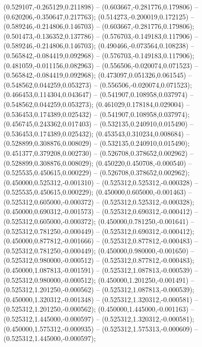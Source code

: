  (0.529107,-0.265129,0.211898) -- (0.603667,-0.281776,0.179806) -- (0.620206,-0.350647,0.217763);
 (0.514273,-0.200019,0.172125) -- (0.589246,-0.214806,0.146703) -- (0.603667,-0.281776,0.179806);
 (0.501473,-0.136352,0.137786) -- (0.576703,-0.149183,0.117906) -- (0.589246,-0.214806,0.146703);
 (0.490466,-0.073564,0.108238) -- (0.565842,-0.084419,0.092968) -- (0.576703,-0.149183,0.117906);
 (0.481059,-0.011156,0.082963) -- (0.556506,-0.020074,0.071523) -- (0.565842,-0.084419,0.092968);
 (0.473097,0.051326,0.061545) -- (0.548562,0.044259,0.053273) -- (0.556506,-0.020074,0.071523);
 (0.466453,0.114304,0.043647) -- (0.541907,0.108958,0.037974) -- (0.548562,0.044259,0.053273);
 (0.461029,0.178184,0.029004) -- (0.536453,0.174389,0.025432) -- (0.541907,0.108958,0.037974);
 (0.456745,0.243362,0.017403) -- (0.532135,0.240910,0.015490) -- (0.536453,0.174389,0.025432);
 (0.453543,0.310234,0.008684) -- (0.528899,0.308876,0.008029) -- (0.532135,0.240910,0.015490);
 (0.451377,0.379208,0.002730) -- (0.526708,0.378652,0.002962) -- (0.528899,0.308876,0.008029);
 (0.450220,0.450708,-0.000540) -- (0.525535,0.450615,0.000229) -- (0.526708,0.378652,0.002962);
 (0.450000,0.525312,-0.001310) -- (0.525312,0.525312,-0.000328) -- (0.525535,0.450615,0.000229);
 (0.450000,0.605000,-0.001463) -- (0.525312,0.605000,-0.000372) -- (0.525312,0.525312,-0.000328);
 (0.450000,0.690312,-0.001573) -- (0.525312,0.690312,-0.000412) -- (0.525312,0.605000,-0.000372);
 (0.450000,0.781250,-0.001641) -- (0.525312,0.781250,-0.000449) -- (0.525312,0.690312,-0.000412);
 (0.450000,0.877812,-0.001666) -- (0.525312,0.877812,-0.000483) -- (0.525312,0.781250,-0.000449);
 (0.450000,0.980000,-0.001650) -- (0.525312,0.980000,-0.000512) -- (0.525312,0.877812,-0.000483);
 (0.450000,1.087813,-0.001591) -- (0.525312,1.087813,-0.000539) -- (0.525312,0.980000,-0.000512);
 (0.450000,1.201250,-0.001491) -- (0.525312,1.201250,-0.000562) -- (0.525312,1.087813,-0.000539);
 (0.450000,1.320312,-0.001348) -- (0.525312,1.320312,-0.000581) -- (0.525312,1.201250,-0.000562);
 (0.450000,1.445000,-0.001163) -- (0.525312,1.445000,-0.000597) -- (0.525312,1.320312,-0.000581);
 (0.450000,1.575312,-0.000935) -- (0.525312,1.575313,-0.000609) -- (0.525312,1.445000,-0.000597);
